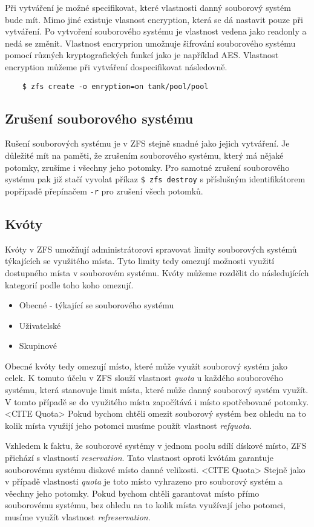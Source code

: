     Při vytváření je možné specifikovat, které vlastnosti danný souborový systém bude mít. Mimo jiné existuje vlasnost encryption, která se dá nastavit pouze při vytváření. Po vytvoření souborového systému je vlastnost vedena jako readonly a nedá se změnit. Vlastnost encryprion umožnuje šifrování souborového systému pomocí různých kryptografických funkcí jako je například AES. Vlastnost encryption můžeme při vytváření dospecifikovat následovně.
    \begin{verbatim}
    $ zfs create -o enryption=on tank/pool/pool
    \end{verbatim}
    \subsection{Zrušení souborového systému}
    Rušení souborových systému je v ZFS stejně snadné jako jejich vytváření. Je důležité mít na paměti, že zrušením souborového systému, který má nějaké potomky, zrušíme i všechny jeho potomky. Pro samotné zrušení souborového systému pak již stačí vyvolat příkaz \verb|$ zfs destroy| s příslušným identifikátorem popřípadě přepínačem \verb|-r| pro zrušení všech potomků.    
    \subsection{Kvóty}
    \label{quota}
    Kvóty v ZFS umožňují administrátorovi spravovat limity souborových systémů týkajících se využitého místa. Tyto limity tedy omezují možnosti využití dostupného místa v souborovém systému. Kvóty můžeme rozdělit do následujících kategorií podle toho koho omezují.
    \begin{itemize}
      \item Obecné - týkající se souborového systému
      \item Uživatelské
      \item Skupinové
    \end{itemize}

    Obecné kvóty tedy omezují místo, které může využít souborový systém jako celek. K tomuto účelu v ZFS slouží vlastnost \emph{quota} u každého souborového systému, která stanovuje limit místa, které může danný souborový systém využít. V tomto případě se do využitého místa započítává i místo spotřebované potomky. <CITE Quota> Pokud bychom chtěli omezit souborový systém bez ohledu na to kolik místa využijí jeho potomci musíme použít vlastnost \emph{refquota}.

    Vzhledem k faktu, že souborové systémy v jednom poolu sdílí dískové místo, ZFS přichází s vlastností \emph{reservation}. Tato vlastnost oproti kvótám garantuje souborovému systému diskové místo danné velikosti. <CITE Quota> Stejně jako v případě vlastnosti \emph{quota} je toto místo vyhrazeno pro souborový systém a věechny jeho potomky. Pokud bychom chtěli garantovat místo přímo souborovému systému, bez ohledu na to kolik místa využívají jeho potomci, musíme využít vlastnost \emph{refreservation}.

